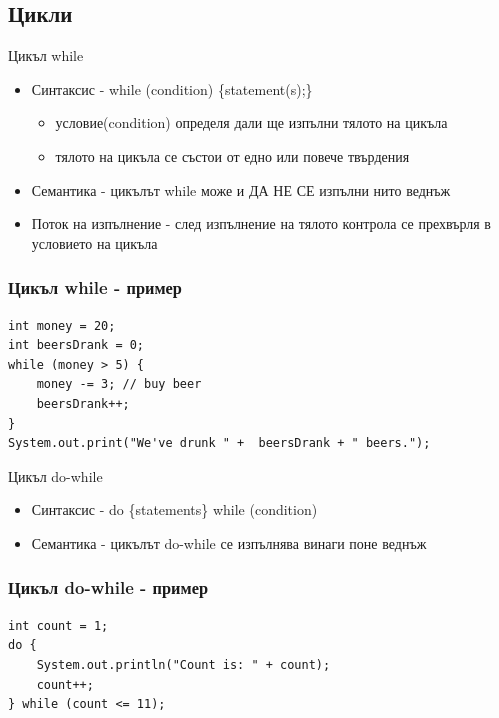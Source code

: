 \documentclass{beamer}
\begin{document}
\subsection{Цикли}

\begin{frame}{Цикъл while}
  \transdissolve
  \begin{itemize}
  \item Синтаксис - while (condition) \{statement(s);\} \pause
    \begin{itemize}
      \item условие(condition) определя дали ще изпълни тялото на
        цикъла \pause
      \item тялото на цикъла се състои от едно или повече твърдения \pause
    \end{itemize}

  \item Семантика - цикълът while може и ДА НЕ СЕ изпълни нито веднъж \pause
  \item Поток на изпълнение - след изпълнение на тялото контрола се
    прехвърля в условието на цикъла
  \end{itemize}
\end{frame}

\begin{frame}[fragile]
  \frametitle{Цикъл while - пример}
  \transdissolve
\begin{lstlisting}
int money = 20;
int beersDrank = 0;
while (money > 5) {
    money -= 3; // buy beer
    beersDrank++;
}
System.out.print("We've drunk " +  beersDrank + " beers.");
\end{lstlisting}
\end{frame}

\begin{frame}{Цикъл do-while}
  \transdissolve
  \begin{itemize}
  \item Синтаксис - do \{statements\} while (condition) \pause
  \item Семантика - цикълът do-while се изпълнява винаги поне веднъж
  \end{itemize}
\end{frame}

\begin{frame}[fragile]
  \frametitle{Цикъл do-while - пример}
  \transdissolve
\begin{lstlisting}
int count = 1;
do {
    System.out.println("Count is: " + count);
    count++;
} while (count <= 11);
\end{lstlisting}
\end{frame}
\end{document}
